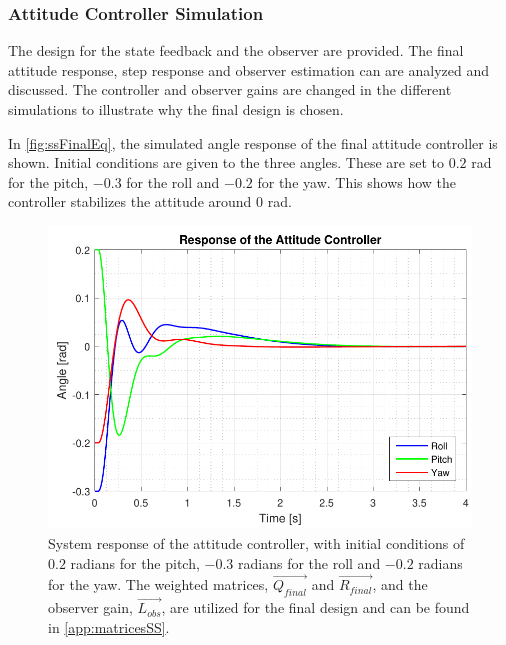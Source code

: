 \subsubsection{Attitude Controller Simulation}\label{sec:AttSim}
The design for the state feedback and the observer are provided. The final attitude response, step response and observer estimation can are analyzed and discussed. The controller and observer gains are changed in the different simulations to illustrate why the final design is chosen.


In \autoref{fig:ssFinalEq}, the simulated angle response of the final attitude controller is shown. Initial conditions are given to the three angles. These are set to $0.2$ rad for the pitch, $-0.3$ for the roll and $-0.2$ for the yaw. This shows how the controller stabilizes the attitude around 0 rad.
%
\begin{figure}[H]
	\centering
	\includegraphics[scale=0.8]{figures/ssFinalEq.pdf}
	\caption{System response of the attitude controller, with initial conditions of $0.2$ radians for the pitch, $-0.3$ radians for the roll and $-0.2$ radians for the yaw. The weighted matrices, $\vec{Q_{final}}$ and $\vec{R_{final}}$, and the observer gain, $\vec{L_{obs}}$, are utilized for the final design and can be found in \autoref{app:matricesSS}.}
	\label{fig:ssFinalEq}
\end{figure}
%

